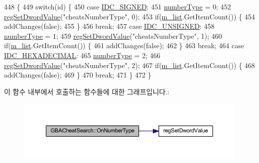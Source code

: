 \begin{DoxyCode}
448 \{
449   \textcolor{keywordflow}{switch}(\textcolor{keywordtype}{id}) \{
450   \textcolor{keywordflow}{case} \mbox{\hyperlink{resource_8h_ae13e01a62e7c40be0e3a93d98d2cd1d3}{IDC\_SIGNED}}:
451     \mbox{\hyperlink{class_g_b_a_cheat_search_a5f4137be5a232d58a5cf4e03c72b008c}{numberType}} = 0;
452     \mbox{\hyperlink{_reg_8cpp_a758e775489a3fb5c3cc7071fdd5af87e}{regSetDwordValue}}(\textcolor{stringliteral}{"cheatsNumberType"}, 0);
453     \textcolor{keywordflow}{if}(\mbox{\hyperlink{class_g_b_a_cheat_search_aab4be5c0e3c3436c738a43f466be0902}{m\_list}}.GetItemCount()) \{
454       addChanges(\textcolor{keyword}{false});
455     \}
456     \textcolor{keywordflow}{break};
457   \textcolor{keywordflow}{case} \mbox{\hyperlink{resource_8h_aeedbb412500d742d9253c77868e55102}{IDC\_UNSIGNED}}:
458     \mbox{\hyperlink{class_g_b_a_cheat_search_a5f4137be5a232d58a5cf4e03c72b008c}{numberType}} = 1;
459     \mbox{\hyperlink{_reg_8cpp_a758e775489a3fb5c3cc7071fdd5af87e}{regSetDwordValue}}(\textcolor{stringliteral}{"cheatsNumberType"}, 1);
460     \textcolor{keywordflow}{if}(\mbox{\hyperlink{class_g_b_a_cheat_search_aab4be5c0e3c3436c738a43f466be0902}{m\_list}}.GetItemCount()) \{
461       addChanges(\textcolor{keyword}{false});
462     \}
463     \textcolor{keywordflow}{break};
464   \textcolor{keywordflow}{case} \mbox{\hyperlink{resource_8h_a41e2d269f242a0163051e37d88a2ee61}{IDC\_HEXADECIMAL}}:
465     \mbox{\hyperlink{class_g_b_a_cheat_search_a5f4137be5a232d58a5cf4e03c72b008c}{numberType}} = 2;
466     \mbox{\hyperlink{_reg_8cpp_a758e775489a3fb5c3cc7071fdd5af87e}{regSetDwordValue}}(\textcolor{stringliteral}{"cheatsNumberType"}, 2);
467     \textcolor{keywordflow}{if}(\mbox{\hyperlink{class_g_b_a_cheat_search_aab4be5c0e3c3436c738a43f466be0902}{m\_list}}.GetItemCount()) \{
468       addChanges(\textcolor{keyword}{false});
469     \}
470     \textcolor{keywordflow}{break};
471   \}
472 \}
\end{DoxyCode}
이 함수 내부에서 호출하는 함수들에 대한 그래프입니다.\+:
\nopagebreak
\begin{figure}[H]
\begin{center}
\leavevmode
\includegraphics[width=350pt]{class_g_b_a_cheat_search_ad75552e2edb79b66761e42965221268c_cgraph}
\end{center}
\end{figure}
\mbox{\label{class_g_b_a_cheat_search_a6e17bbbf43d2a744853abfb00fa791ec}} 
